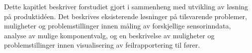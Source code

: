 Dette kapitlet beskriver forstudiet gjort i sammenheng med utvikling av løsning
på produktidéen. Det beskrives eksisterende løsninger på tilsvarende problemer, 
muligheter og problemstillinger innen måling av forskjellige sensorinndata, analyse av mulige komponentvalg, og en beskrivelse av muligheter og problemstillinger
innen visualisering av feilrapportering til fører.
